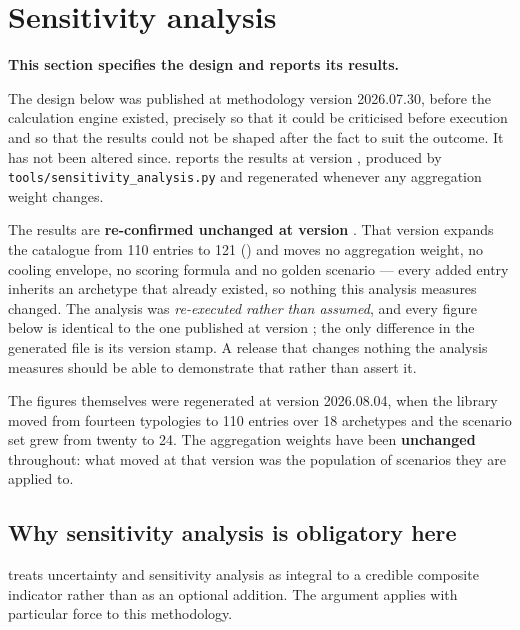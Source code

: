 \section{Sensitivity analysis}
\label{sec:sensitivity}

\begin{keynote}
\noindent\textbf{This section specifies the design and reports its results.}

The design below was published at methodology version 2026.07.30, before the
calculation engine existed, precisely so that it could be criticised before
execution and so that the results could not be shaped after the fact to suit
the outcome. It has not been altered since.
 reports the results at version \methver{},
produced by \texttt{tools/sensitivity\_analysis.py} and regenerated whenever
any aggregation weight changes.

The results are \textbf{re-confirmed unchanged at version \methver{}}. That
version expands the catalogue from \num{110} entries to \num{121}
() and moves no aggregation weight, no cooling envelope,
no scoring formula and no golden scenario --- every added entry inherits an
archetype that already existed, so nothing this analysis measures changed. The
analysis was \emph{re-executed rather than assumed}, and every figure below is
identical to the one published at version \prevver{}; the only difference in
the generated file is its version stamp. A release that changes nothing the
analysis measures should be able to demonstrate that rather than assert it.

The figures themselves were regenerated at version 2026.08.04, when the library
moved from fourteen typologies to \num{110} entries over \num{18} archetypes
and the scenario set grew from twenty to \num{24}. The aggregation weights have
been \textbf{unchanged} throughout: what moved at that version was the
population of scenarios they are applied to.
\end{keynote}

\subsection{Why sensitivity analysis is obligatory here}

\textcite{nardo2008} treats uncertainty and sensitivity analysis as integral to
a credible composite indicator rather than as an optional addition. The
argument applies with particular force to this methodology.

